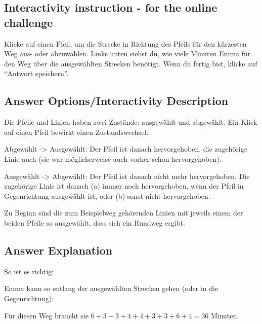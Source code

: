 \documentclass[a4paper,11pt]{report}
\newcommand{\taskGraphicsFolder}{..}
\begin{document}
\subsection*{Interactivity instruction - for the online challenge}

Klicke auf einen Pfeil, um die Strecke in Richtung des Pfeils für den kürzesten Weg aus- oder abzuwählen.
Links unten siehst du, wie viele Minuten Emma für den Weg über die ausgewählten Strecken benötigt.
Wenn du fertig bist, klicke auf \enquote{Antwort speichern}.

\begingroup
\renewcommand{\arraystretch}{1.5}
\subsection*{Answer Options/Interactivity Description}

Die Pfeile und Linien haben zwei Zustände: ausgewählt und abgewählt.
Ein Klick auf einen Pfeil bewirkt einen Zustandswechsel:

Abgewählt -> Ausgewählt:
Der Pfeil ist danach hervorgehoben, die zugehörige Linie auch (sie war möglicherweise auch vorher schon hervorgehoben).

Ausgewählt -> Abgewählt:
Der Pfeil ist danach nicht mehr hervorgehoben.  Die zugehörige Linie ist danach (a) immer noch hervorgehoben, wenn der Pfeil in Gegenrichtung ausgewählt ist, oder (b) sonst nicht hervorgehoben.

Zu Beginn sind die zum Beispielweg gehörenden Linien mit jeweils einem der beiden Pfeile so ausgewählt, dass sich ein Rundweg ergibt.

\endgroup

\subsection*{Answer Explanation}

So ist es richtig:

{\centering%
\par}

Emma kann so entlang der ausgewählten Strecken gehen (oder in die Gegenrichtung):

{\centering%
\par}

Für diesen Weg braucht sie ${6 + 3 + 3 + 4 + 4 + 3 + 3 + 6 + 4 = 36}$ Minuten.
\end{document}
